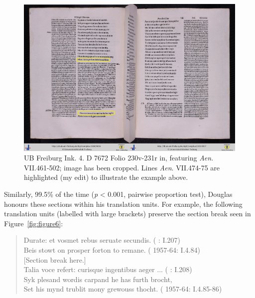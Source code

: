 \documentclass{dhbenelux}
\begin{document}
\begin{figure}[H]
\begin{center}
\includegraphics[width=1\linewidth]{Images/Figure7.jpg}
\end{center}
\caption{UB Freiburg Ink. 4. D 7672 Folio 230v-231r in, featuring \emph{Aen}. VII.461-502; image has been cropped.  Lines \emph{Aen}. VII.474-75 are highlighted (my edit) to illustrate the example above.}
\label{fig:figure7}
\end{figure}

Similarly, 99.5\% of the time (\emph{p} \textless{} 0.001, pairwise
proportion test), Douglas honours these sections
within his translation units. For example, the following translation
units (labelled with large brackets) preserve the section break seen in
Figure~\ref{fig:figure6}:

\begin{quote}
Durate: et vosmet rebus seruate secundis. (\citeauthor{virgil1501} \citeyear{virgil1501}: I.207)\\

Beis stowt on prosper forton to remane. (\citeauthor{douglas1957} 1957-64: I.4.84)\\

{[}Section break here.{]}\\

Talia voce refert: curisque ingentibus aeger ... (\citeauthor{virgil1501} \citeyear{virgil1501}: I.208)\\

Syk plesand wordis carpand he has furth brocht,\\
Set his mynd trublit mony grewouss thocht. (\citeauthor{douglas1957} 1957-64: I.4.85-86)
\end{quote}
\end{document}
